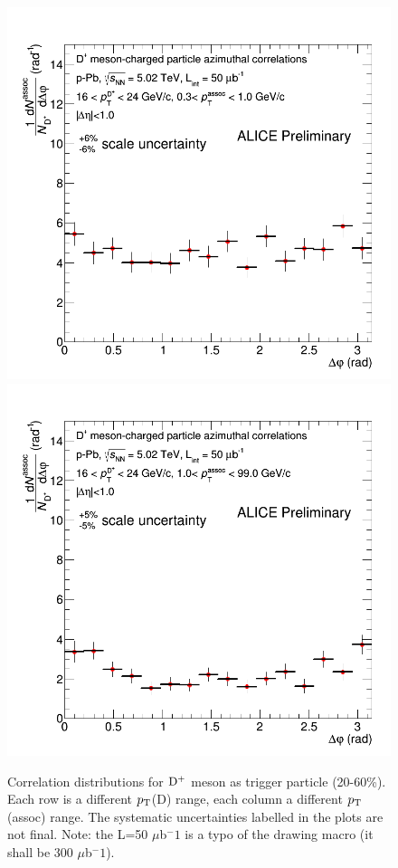 \begin{figure}
{\includegraphics[width=0.32\linewidth]{figuresVsCent/Dplus/Correlations/2060/CanvaAndVariedHistopPbDplusPt16to24assocPt03to1.png}}
{\includegraphics[width=0.32\linewidth]{figuresVsCent/Dplus/Correlations/2060/CanvaAndVariedHistopPbDplusPt16to24assocPt1to99.png}}
 \caption{Correlation distributions for ${\rm D^+}$ meson as trigger particle (20-60\%). Each row is a different $p_{\rm T}$(D) range, each column a different $p_{\rm T}$(assoc) range. The systematic uncertainties labelled in the plots are not final. Note: the L=50 $\mu$b$^-1$ is a typo of the drawing macro (it shall be 300 $\mu$b$^-1$).}
\label{fig:Dpluscorr2060}
\end{figure}

